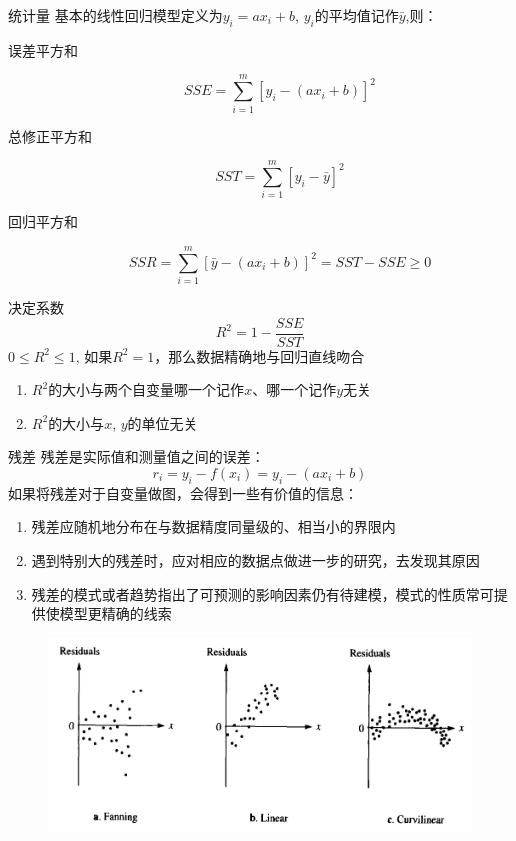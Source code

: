 \documentclass[mathserif, table]{beamer}
\begin{document}
\begin{frame}{统计量}
  基本的线性回归模型定义为$y_i = ax_i + b$, $y_i$的平均值记作$\bar{y}$,则：

  \begin{description}
  \item[误差平方和] 
    \[
    SSE = \sum_{i=1}^m [y_i - (ax_i + b)]^2
    \]
  \item[总修正平方和] 
    \[
    SST = \sum_{i=1}^m [y_i - \bar{y}]^2
    \]
  \item[回归平方和] 
    \[
    SSR = \sum_{i=1}^m [\bar{y} - (ax_i + b)]^2 = SST - SSE \ge 0
    \]
  \end{description}
  
\end{frame}

\begin{frame}{决定系数}
  \[
  R^2 = 1 - \frac{SSE}{SST}
  \]
  $0 \le R^2 \le 1$, 如果$R^2 = 1$，那么数据精确地与回归直线吻合

  \begin{enumerate}
  \item $R^2$的大小与两个自变量哪一个记作$x$、哪一个记作$y$无关
  \item $R^2$的大小与$x$, $y$的单位无关
  \end{enumerate}

\end{frame}

\begin{frame}{残差}
  残差是实际值和测量值之间的误差：
  \[
  r_i = y_i - f(x_i) = y_i - (ax_i + b)
  \]
  如果将残差对于自变量做图，会得到一些有价值的信息：
  \begin{enumerate}
  \item 残差应随机地分布在与数据精度同量级的、相当小的界限内
  \item 遇到特别大的残差时，应对相应的数据点做进一步的研究，去发现其原因
  \item 残差的模式或者趋势指出了可预测的影响因素仍有待建模，模式的性质常可提供使模型更精确的线索
  \end{enumerate}

  \begin{figure}
    \centering
    \includegraphics[width=.4\textwidth{}]{error.png}
  \end{figure}

\end{frame}
\end{document}
